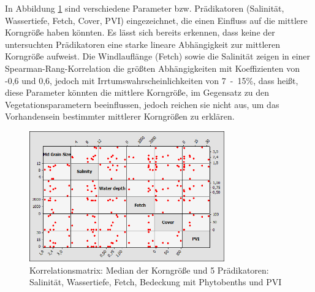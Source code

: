\FloatBarrier

In Abbildung \ref{fig:matrixplot} sind verschiedene Parameter bzw. Prädikatoren (Salinität, Wassertiefe, Fetch, Cover, PVI) eingezeichnet, die einen Einfluss auf die mittlere Korngröße haben könnten. Es lässt sich bereits erkennen, dass keine der untersuchten Prädikatoren eine starke lineare Abhängigkeit zur mittleren Korngröße aufweist. Die Windlauflänge (Fetch) sowie die Salinität zeigen in einer Spearman-Rang-Korrelation die größten Abhängigkeiten mit Koeffizienten von -0,6 und 0,6, jedoch mit Irrtumswahrscheinlichkeiten von \unit{7-15}{\%}, dass heißt, diese Parameter könnten die mittlere Korngröße, im Gegensatz zu den Vegetationsparametern beeinflussen, jedoch reichen sie nicht aus, um das Vorhandensein bestimmter mittlerer Korngrößen zu erklären.


\begin{figure}[!htb]
\centering
\includegraphics[width=0.75\textwidth]{images/matrixplot/Matrixplot_ohne_Grieben_neu2.png}
\caption[Korrelationsmatrix: Median der Korngröße und 5 Prädikatoren]{Korrelationsmatrix: Median der Korngröße und 5 Prädikatoren: Salinität, Wassertiefe, Fetch, Bedeckung mit Phytobenths und PVI}
\label{fig:matrixplot}
\end{figure}

\FloatBarrier


